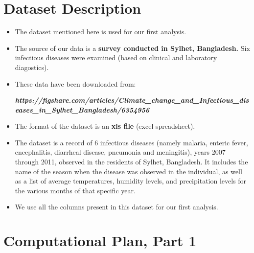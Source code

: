 \documentclass[fontsize=11pt]{article}
\begin{document}
    \section*{Dataset Description}

    \begin{itemize}

        \item The dataset mentioned here is used for our first analysis.
        \item  The source of our data is a \textbf{survey conducted in Sylhet, Bangladesh.} Six infectious diseases were examined (based on clinical and laboratory diagostics).

        \item These data have been downloaded from:

        \textbf{\textit{https://figshare.com/articles/Climate\_change\_and\_Infectious\_diseases\_in\_Sylhet\_Bangladesh/6354956}}

        \item The format of the dataset is an \textbf{xls file} (excel spreadsheet).

        \item The dataset is a record of 6 infectious diseases (namely malaria, enteric fever, encephalitis, diarrheal disease, pneumonia and meningitis), years 2007 through 2011, observed in the residents of Sylhet, Bangladesh. It includes the name of the season when the disease was observed in the individual, as well as a list of average temperatures, humidity levels, and precipitation levels for the various months of that specific year.

        \item We use all the columns present in this dataset for our first analysis.

    \end{itemize}



    \section*{Computational Plan, Part 1}
\end{document}
